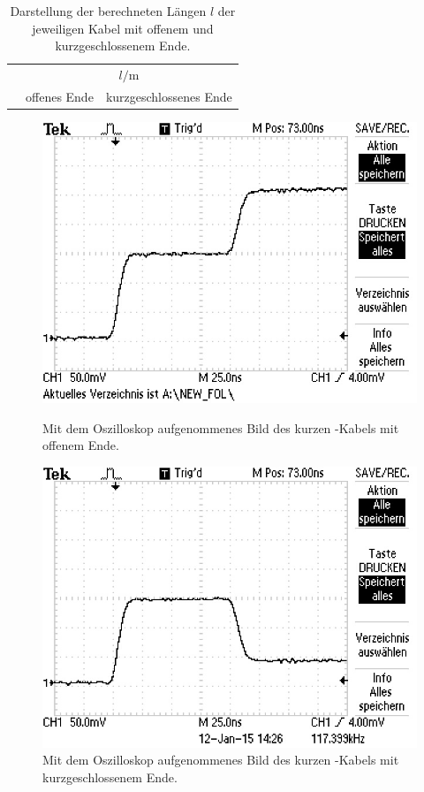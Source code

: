 \begin{table}[h]
  \centering
  \begin{tabular}{lcc}
    \midrule
    \midrule
    & \multicolumn{2}{c}{$l / \si{\meter}$} \\
    \cmidrule(lr{0.75em}){2-3}
    & offenes Ende & kurzgeschlossenes Ende \\
    \midrule
    
    \midrule
    \midrule
  \end{tabular}
  \caption{Darstellung der berechneten Längen $l$ der jeweiligen Kabel mit
    offenem und kurzgeschlossenem Ende.}
  \label{tab:Laengen}
\end{table}

\begin{figure}[ht]
  \centering
  \includegraphics[scale=1.0]{bilder/reflexion/F0000TEK.JPG}
  \caption{Mit dem Oszilloskop aufgenommenes Bild des kurzen \CU-Kabels mit
  offenem Ende.}
  \label{fig:oszi_50k_offen}
  \vspace{2em}
  \includegraphics[scale=1.0]{bilder/reflexion/F0001TEK.JPG}
  \caption{Mit dem Oszilloskop aufgenommenes Bild des kurzen \CU-Kabels mit
  kurzgeschlossenem Ende.}
  \label{fig:oszi_50k_kurz}
\end{figure}
